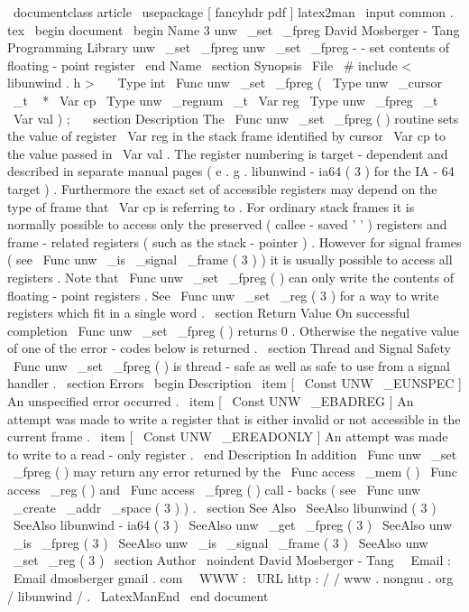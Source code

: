 \
documentclass
{
article
}
\
usepackage
[
fancyhdr
pdf
]
{
latex2man
}
\
input
{
common
.
tex
}
\
begin
{
document
}
\
begin
{
Name
}
{
3
}
{
unw
\
_set
\
_fpreg
}
{
David
Mosberger
-
Tang
}
{
Programming
Library
}
{
unw
\
_set
\
_fpreg
}
unw
\
_set
\
_fpreg
-
-
set
contents
of
floating
-
point
register
\
end
{
Name
}
\
section
{
Synopsis
}
\
File
{
\
#
include
<
libunwind
.
h
>
}
\
\
\
Type
{
int
}
\
Func
{
unw
\
_set
\
_fpreg
}
(
\
Type
{
unw
\
_cursor
\
_t
~
*
}
\
Var
{
cp
}
\
Type
{
unw
\
_regnum
\
_t
}
\
Var
{
reg
}
\
Type
{
unw
\
_fpreg
\
_t
}
\
Var
{
val
}
)
;
\
\
\
section
{
Description
}
The
\
Func
{
unw
\
_set
\
_fpreg
}
(
)
routine
sets
the
value
of
register
\
Var
{
reg
}
in
the
stack
frame
identified
by
cursor
\
Var
{
cp
}
to
the
value
passed
in
\
Var
{
val
}
.
The
register
numbering
is
target
-
dependent
and
described
in
separate
manual
pages
(
e
.
g
.
libunwind
-
ia64
(
3
)
for
the
IA
-
64
target
)
.
Furthermore
the
exact
set
of
accessible
registers
may
depend
on
the
type
of
frame
that
\
Var
{
cp
}
is
referring
to
.
For
ordinary
stack
frames
it
is
normally
possible
to
access
only
the
preserved
(
callee
-
saved
'
'
)
registers
and
frame
-
related
registers
(
such
as
the
stack
-
pointer
)
.
However
for
signal
frames
(
see
\
Func
{
unw
\
_is
\
_signal
\
_frame
}
(
3
)
)
it
is
usually
possible
to
access
all
registers
.
Note
that
\
Func
{
unw
\
_set
\
_fpreg
}
(
)
can
only
write
the
contents
of
floating
-
point
registers
.
See
\
Func
{
unw
\
_set
\
_reg
}
(
3
)
for
a
way
to
write
registers
which
fit
in
a
single
word
.
\
section
{
Return
Value
}
On
successful
completion
\
Func
{
unw
\
_set
\
_fpreg
}
(
)
returns
0
.
Otherwise
the
negative
value
of
one
of
the
error
-
codes
below
is
returned
.
\
section
{
Thread
and
Signal
Safety
}
\
Func
{
unw
\
_set
\
_fpreg
}
(
)
is
thread
-
safe
as
well
as
safe
to
use
from
a
signal
handler
.
\
section
{
Errors
}
\
begin
{
Description
}
\
item
[
\
Const
{
UNW
\
_EUNSPEC
}
]
An
unspecified
error
occurred
.
\
item
[
\
Const
{
UNW
\
_EBADREG
}
]
An
attempt
was
made
to
write
a
register
that
is
either
invalid
or
not
accessible
in
the
current
frame
.
\
item
[
\
Const
{
UNW
\
_EREADONLY
}
]
An
attempt
was
made
to
write
to
a
read
-
only
register
.
\
end
{
Description
}
In
addition
\
Func
{
unw
\
_set
\
_fpreg
}
(
)
may
return
any
error
returned
by
the
\
Func
{
access
\
_mem
}
(
)
\
Func
{
access
\
_reg
}
(
)
and
\
Func
{
access
\
_fpreg
}
(
)
call
-
backs
(
see
\
Func
{
unw
\
_create
\
_addr
\
_space
}
(
3
)
)
.
\
section
{
See
Also
}
\
SeeAlso
{
libunwind
(
3
)
}
\
SeeAlso
{
libunwind
-
ia64
(
3
)
}
\
SeeAlso
{
unw
\
_get
\
_fpreg
(
3
)
}
\
SeeAlso
{
unw
\
_is
\
_fpreg
(
3
)
}
\
SeeAlso
{
unw
\
_is
\
_signal
\
_frame
(
3
)
}
\
SeeAlso
{
unw
\
_set
\
_reg
(
3
)
}
\
section
{
Author
}
\
noindent
David
Mosberger
-
Tang
\
\
Email
:
\
Email
{
dmosberger
gmail
.
com
}
\
\
WWW
:
\
URL
{
http
:
/
/
www
.
nongnu
.
org
/
libunwind
/
}
.
\
LatexManEnd
\
end
{
document
}
